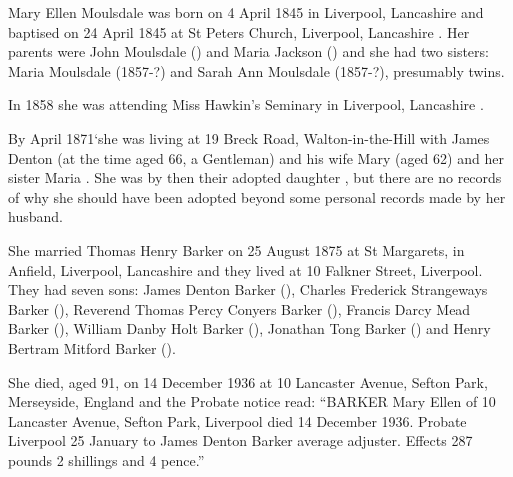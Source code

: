 
Mary Ellen Moulsdale was born on 4 April 1845 in Liverpool, Lancashire \cite{MEMoulsdaleBirth} and baptised on 24 April 1845 at St Peters Church, Liverpool, Lancashire \cite{MEMoulsdaleBaptism}. Her parents were John Moulsdale () and Maria Jackson () and she had two sisters: Maria Moulsdale (1857-?) and Sarah Ann Moulsdale (1857-?), presumably twins. 

In 1858 she was attending Miss Hawkin's Seminary in Liverpool, Lancashire \cite{MEMoulsdaleSchool}. 
  
By April 1871`she was living at 19 Breck Road, Walton-in-the-Hill with James Denton (at the time aged 66, a Gentleman) and his wife Mary (aged 62) and her sister Maria \cite{MEMoulsdaleResidence}.  She was by then their adopted daughter \cite{MEMoulsdaleAdoption},  but there are no records of why she should have been adopted beyond some personal records made by her husband. 

She married Thomas Henry Barker on 25 August 1875 at St Margarets, in Anfield, Liverpool, Lancashire \cite{MEMoulsdaleMarriage} and they lived at 10 Falkner Street, Liverpool.  They had seven sons: James Denton Barker (), Charles Frederick Strangeways Barker (), Reverend Thomas Percy Conyers Barker (), Francis Darcy Mead Barker (), William Danby Holt Barker (), Jonathan Tong Barker () and Henry Bertram Mitford Barker ().

She died, aged 91, on 14 December 1936 at 10 Lancaster Avenue, Sefton Park, Merseyside, England \cite{ToxtethBarker20} and the Probate notice read:
``BARKER Mary Ellen of 10 Lancaster Avenue, Sefton Park, Liverpool died 14 December 1936. Probate Liverpool 25 January to James Denton Barker average adjuster. Effects 287 pounds 2 shillings and 4 pence.''

